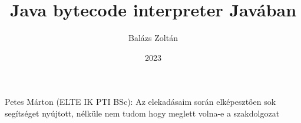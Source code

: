 \documentclass[
]{elteikthesis}[2022/04/30]
\title{Java bytecode interpreter Javában} %
\date{2023} %
\author{Balázs Zoltán}
\affiliation{egyetemi docens} %
\begin{document}


\newcommand{\stagemagic}[1]{\textcolor{brown}{#1}}
\newcommand{\stageminor}[1]{\textcolor{orange}{#1}}
\newcommand{\stagemajor}[1]{\textcolor{red}{#1}}
\newcommand{\stageconstantsize}[1]{\textcolor{green}{#1}}
\newcommand{\stageconstantpool}[1]{\textcolor{teal}{#1}}
\newcommand{\stageaccessflags}[1]{\textcolor{blue}{#1}}
\newcommand{\stagethisclass}[1]{\textcolor{magenta}{#1}}
\newcommand{\stagesuperclass}[1]{\textcolor{violet}{#1}}
\newcommand{\stageinterfacesize}[1]{\textcolor{cyan}{#1}}
\newcommand{\stagefieldsize}[1]{\textcolor{orange}{#1}}
\newcommand{\stagemethodsize}[1]{\textcolor{red}{#1}}
\newcommand{\stagemethods}[1]{\textcolor{purple}{#1}}
\newcommand{\stageattributes}[1]{\textcolor{lime}{#1}}

\maketitle


\tableofcontents
\cleardoublepage{}


\cleardoublepage{}


\cleardoublepage{}


\cleardoublepage{}


\cleardoublepage{}

\chapter*{\acklabel}
Petes Márton (ELTE IK PTI BSc): Az elekadásaim során elképesztően sok segítséget nyújtott, nélküle nem tudom hogy meglett volna-e a szakdolgozat

\printbibliography[title=\biblabel]
\cleardoublepage{}

\listoftables
\cleardoublepage{}

\lstlistoflistings{}
\cleardoublepage{}

\end{document}
